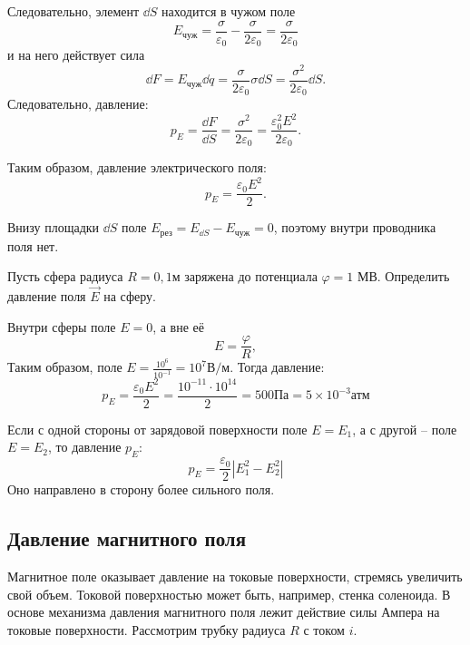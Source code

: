     Следовательно, элемент \( \dd S \) находится в чужом поле
    \[
        E_{\textit{чуж}} = \frac{\sigma}{\varepsilon_0} -
        \frac{\sigma}{2\varepsilon_0} = \frac{\sigma}{2\varepsilon_0}
    \]
    и на него действует сила
    \[
        \dd F = E_{\textit{чуж}}\dd q =
        \frac{\sigma}{2\varepsilon_0}\sigma\dd S =
        \frac{\sigma^2}{2\varepsilon_0}\dd S.
    \]
    Следовательно, давление:
    \[
        p_E = \frac{\dd F}{\dd S} = \frac{\sigma^2}{2\varepsilon_0} = 
        \frac{\varepsilon_0^2E^2}{2\varepsilon_0}.
    \]
    
    Таким образом, давление электрического поля:
    \begin{equation}
        p_E = \frac{\varepsilon_0E^2}{2}.
    \end{equation}
    
    \begin{remark}
        Внизу площадки \( \dd S \) поле \( E_{\textit{рез}} = E_{\dd S} - 
        E_{\textit{чуж}} = 0 \), поэтому внутри проводника поля нет.
    \end{remark}

    \begin{example}
        Пусть сфера радиуса \( R = 0,1 \)м заряжена до потенциала
        \( \varphi = 1 \) МВ. Определить давление поля \( \vec{E} \) на сферу.
    \end{example}
    
    \begin{solution}
        Внутри сферы поле \( E = 0 \), а вне её
        \[
            E = \frac{\varphi}{R},
        \]
        Таким образом, поле \( E = \frac{10^6}{10^{-1}} = 
        10^7 \text{В}/\text{м} \).
        Тогда давление:
        \[
            p_E = \frac{\varepsilon_0 E^2}{2} = \frac{10^{-11} \cdot 10^{14}}{2}
            = 500 \text{Па} = 5 \times 10^{-3} \text{атм}
        \]
    \end{solution}
    
    \begin{remark}
        Если с одной стороны от зарядовой поверхности поле \( E = E_1 \), а с
        другой -- поле \( E = E_2 \), то давление \( p_E \):
        \begin{equation}
            p_E = \frac{\varepsilon_0}{2}|E_1^2 - E_2^2|
        \end{equation}
        Оно направлено в сторону более сильного поля.
    \end{remark}

\subsection{Давление магнитного поля}
    Магнитное поле оказывает давление на токовые поверхности, стремясь увеличить
    свой объем. Токовой поверхностью может быть, например, стенка соленоида. В 
    основе механизма давления магнитного поля лежит действие силы Ампера на
    токовые поверхности. Рассмотрим трубку радиуса \( R \) с током \( i \).
    
